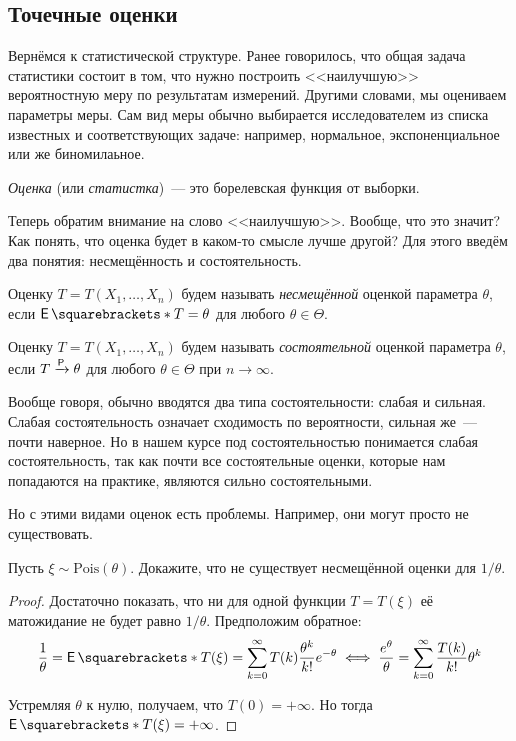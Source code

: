 \subsection{Точечные оценки}
Вернёмся к статистической структуре. Ранее говорилось, что общая задача 
статистики состоит в том, что нужно построить <<наилучшую>> вероятностную меру 
по результатам измерений. Другими словами, мы оцениваем параметры меры. Сам вид 
меры обычно выбирается исследователем из списка известных и соответствующих 
задаче: например, нормальное, экспоненциальное или же биномилаьное.
\begin{definition}
	\emph{Оценка} (или \emph{статистка})~--- это борелевская функция от выборки.
\end{definition}

Теперь обратим внимание на слово <<наилучшую>>. Вообще, что это значит? Как 
понять, что оценка будет в каком-то смысле лучше другой? Для этого введём два 
понятия: несмещённость и состоятельность.
\begin{definition}
	Оценку \(T = T(X_{1}, \dots, X_{n})\) будем называть \emph{несмещённой} 
	оценкой параметра \(\theta\), если \(\E{T} = \theta\) для любого \(\theta 
	\in \Theta\).
\end{definition}
\begin{definition}
	Оценку \(T = T(X_{1}, \dots, X_{n})\) будем называть \emph{состоятельной} 
	оценкой параметра \(\theta\), если \(T \prto \theta\) для любого \(\theta 
	\in \Theta\) при \(n \to \infty\).
\end{definition}
\begin{remark}
	Вообще говоря, обычно вводятся два типа состоятельности: слабая и сильная. 
	Слабая состоятельность означает сходимость по вероятности, сильная же~--- 
	почти наверное. Но в нашем курсе под состоятельностью понимается слабая 
	состоятельность, так как почти все состоятельные оценки, которые нам 
	попадаются на практике, являются сильно состоятельными.
\end{remark}

Но с этими видами оценок есть проблемы. Например, они могут просто не 
существовать.
\begin{problem}
	Пусть \(\xi \sim \mathrm{Pois}(\theta)\). Докажите, что не существует 
	несмещённой оценки для \(1/\theta\).
\end{problem}
\begin{proof}
	Достаточно показать, что ни для одной функции \(T = T(\xi)\) её матожидание 
	не будет равно \(1/\theta\). Предположим обратное:
	\[
		\frac{1}{\theta} = \E{T(\xi)} = \sum_{k = 0}^{\infty} 
		T(k)\frac{\theta^{k}}{k!}e^{-\theta} \iff \frac{e^{\theta}}{\theta} = 
		\sum_{k = 0}^{\infty} 
		\frac{T(k)}{k!}\theta^{k}
	\]
	
	Устремляя \(\theta\) к нулю, получаем, что \(T(0) = +\infty\). Но тогда 
	\(\E{T(\xi)} = +\infty\).
\end{proof}